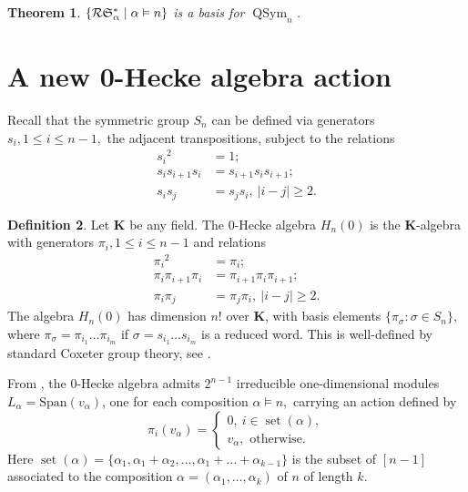 \documentclass[12pt,letterpaper]{amsart}
\newtheorem{theorem}{Theorem}[section]
\theoremstyle{definition}
\newtheorem{definition}[theorem]{Definition}
\DeclareMathOperator{\set}{set}
\newcommand{\Qsym}{\ensuremath{\operatorname{QSym}}}
\newcommand{\suchthat}{\;|\;}
\begin{document}
\begin{theorem}\label{the:RIasDI}\cite{NSvWVW2023}
 $\{ \RI _\alpha \suchthat \alpha \vDash n\}$ is a basis for $\Qsym _n$.
\end{theorem} 

\section{A new 0-Hecke algebra action} 
\label{sec:Hecke-action-RSImm}

Recall that the symmetric group $S_n$ can be defined via generators $s_i, 1\le i\le n-1,$ the adjacent transpositions, subject to the relations 
\begin{align*} {s_i}^2 &=1; \\
               s_i s_{i+1}s_i &=s_{i+1}s_is_{i+1};\\
                  s_is_j &=s_js_i, \ |i-j|\ge 2.
\end{align*}

\begin{definition}\cite{PamelaBromwichNorton1979, Mathas1999} Let $\mathbf{K}$ be any field.  The 0-Hecke algebra $H_n(0)$ is the $\mathbf{K}$-algebra with 
generators $\pi_i, 1\le i\le n-1$ and relations 
\begin{align*} {\pi_i}^2 &=\pi_i; \\
               \pi_i\pi_{i+1}\pi_i &=\pi_{i+1}\pi_i\pi_{i+1};\\
                  \pi_i\pi_j &=\pi_j\pi_i, \ |i-j|\ge 2.
\end{align*}
The algebra $H_n(0)$ has dimension $n!$ over  $\mathbf{K}$, with basis elements $\{\pi_\sigma: \sigma\in S_n\},$ where $\pi_\sigma=\pi_{i_1}\ldots \pi_{i_m}$ if $\sigma=s_{i_1}\ldots s_{i_m}$ is a reduced word. This is well-defined by standard Coxeter group theory, 
see \cite{BjBrenti2005}.
\end{definition}

From \cite{PamelaBromwichNorton1979}, the 0-Hecke algebra admits  $2^{n-1}$ irreducible one-dimensional modules $L_\alpha=\mathrm{Span}(v_\alpha)$, one for each composition $\alpha\vDash n,$ carrying an action defined by 
\begin{equation}\label{eqn:HeckeIrreps} \pi_i(v_\alpha)=\begin{cases} 0, \ i\in \set(\alpha),\\
  v_\alpha, \text{ otherwise.}\end{cases}
\end{equation}
Here $\set(\alpha)=\{\alpha_1, \alpha_1+\alpha_2,\ldots, \alpha_1+\ldots+\alpha_{k-1}\}$ is the subset of $[n-1]$ associated to the composition $\alpha=(\alpha_1, \ldots , \alpha_k)$ of $n$ of length $k.$  
\end{document}
